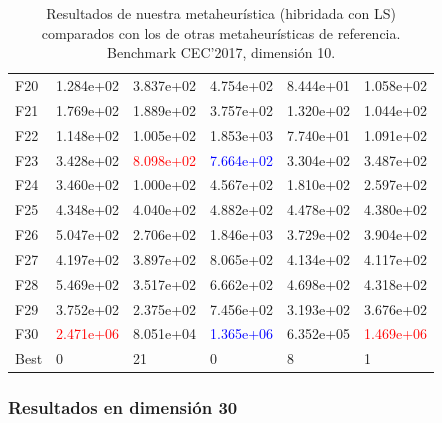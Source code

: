 \documentclass{article}
\begin{document}
\begin{table}[H]
\begin{tabular}{|l|lllll|}
	F20  &  1.284e+02 &  3.837e+02 &  4.754e+02 &  8.444e+01 &  1.058e+02 \\
	F21  &  1.769e+02 &  1.889e+02 &  3.757e+02 &  1.320e+02 &  1.044e+02 \\
	F22  &  1.148e+02 &  1.005e+02 &  1.853e+03 &  7.740e+01 &  1.091e+02 \\
	F23  &  3.428e+02 &  \textcolor{red}{8.098e+02} &  \textcolor{blue}{7.664e+02} &  3.304e+02 &  3.487e+02 \\
	F24  &  3.460e+02 &  1.000e+02 &  4.567e+02 &  1.810e+02 &  2.597e+02 \\
	F25  &  4.348e+02 &  4.040e+02 &  4.882e+02 &  4.478e+02 &  4.380e+02 \\
	F26  &  5.047e+02 &  2.706e+02 &  1.846e+03 &  3.729e+02 &  3.904e+02 \\
	F27  &  4.197e+02 &  3.897e+02 &  8.065e+02 &  4.134e+02 &  4.117e+02 \\
	F28  &  5.469e+02 &  3.517e+02 &  6.662e+02 &  4.698e+02 &  4.318e+02 \\
	F29  &  3.752e+02 &  2.375e+02 &  7.456e+02 &  3.193e+02 &  3.676e+02 \\
	F30  &  \textcolor{red}{2.471e+06} &  8.051e+04 &  \textcolor{blue}{1.365e+06} &  6.352e+05 &  \textcolor{red}{1.469e+06} \\\hline
	Best &          0 &         21 &          0 &          8 &          1 \\
	\hline
\end{tabular}
	\caption{Resultados de nuestra metaheurística (hibridada con LS) comparados con los de otras metaheurísticas de referencia. Benchmark CEC'2017, dimensión 10.}
	\label{tab:hybrid-10}
\end{table}

\subsubsection*{Resultados en dimensión 30}
\end{document}

